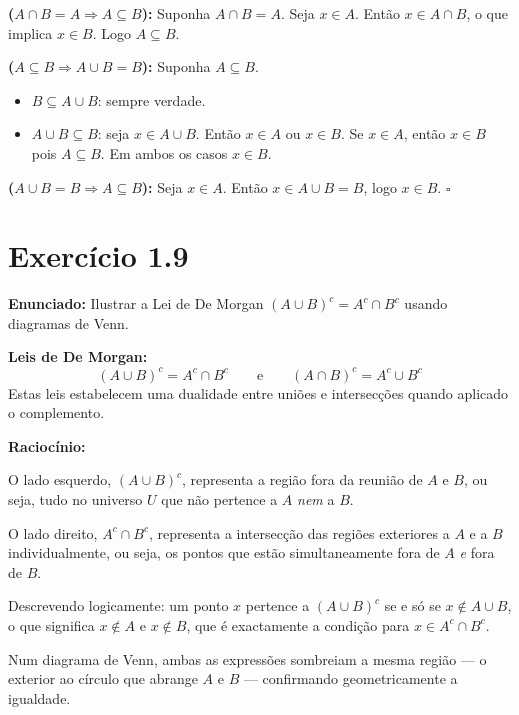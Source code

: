 \documentclass[12pt,a4paper]{article}
\begin{document}
\textbf{($A \cap B = A \Rightarrow A \subseteq B$):} Suponha $A \cap B = A$. Seja $x \in A$. Então $x \in A \cap B$, o que implica $x \in B$. Logo $A \subseteq B$.

\textbf{($A \subseteq B \Rightarrow A \cup B = B$):} Suponha $A \subseteq B$.
\begin{itemize}
  \item $B \subseteq A \cup B$: sempre verdade.
  \item $A \cup B \subseteq B$: seja $x \in A \cup B$. Então $x \in A$ ou $x \in B$. Se $x \in A$, então $x \in B$ pois $A \subseteq B$. Em ambos os casos $x \in B$.
\end{itemize}

\textbf{($A \cup B = B \Rightarrow A \subseteq B$):} Seja $x \in A$. Então $x \in A \cup B = B$, logo $x \in B$. \hfill$\square$

\section*{Exercício 1.9}

\textbf{Enunciado:} Ilustrar a Lei de De Morgan $(A \cup B)^c = A^c \cap B^c$ usando diagramas de Venn.

\begin{teoribox}
\textbf{Leis de De Morgan:}
\[
(A \cup B)^c = A^c \cap B^c \qquad \text{e} \qquad (A \cap B)^c = A^c \cup B^c
\]
Estas leis estabelecem uma dualidade entre uniões e intersecções quando aplicado o complemento.
\end{teoribox}

\textbf{Raciocínio:}

O lado esquerdo, $(A \cup B)^c$, representa a região fora da reunião de $A$ e $B$, ou seja, tudo no universo $U$ que não pertence a $A$ \emph{nem} a $B$.

O lado direito, $A^c \cap B^c$, representa a intersecção das regiões exteriores a $A$ e a $B$ individualmente, ou seja, os pontos que estão simultaneamente fora de $A$ \emph{e} fora de $B$.

Descrevendo logicamente: um ponto $x$ pertence a $(A \cup B)^c$ se e só se $x \notin A \cup B$, o que significa $x \notin A$ e $x \notin B$, que é exactamente a condição para $x \in A^c \cap B^c$.

Num diagrama de Venn, ambas as expressões sombreiam a mesma região --- o exterior ao círculo que abrange $A$ e $B$ --- confirmando geometricamente a igualdade.
\end{document}
